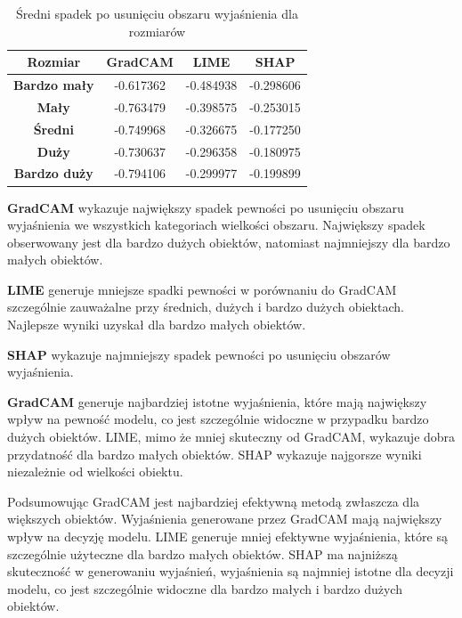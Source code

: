 \begin{table}[h]
	\centering
	\begin{tabular}{|c|c|c|c|}
		\hline
		\textbf{Rozmiar}     & \textbf{GradCAM} & \textbf{LIME} & \textbf{SHAP} \\
		\hline
		\textbf{Bardzo mały} & -0.617362        & -0.484938     & -0.298606     \\
		\hline
		\textbf{Mały}        & -0.763479        & -0.398575     & -0.253015     \\
		\hline
		\textbf{Średni}      & -0.749968        & -0.326675     & -0.177250     \\
		\hline
		\textbf{Duży}        & -0.730637        & -0.296358     & -0.180975     \\
		\hline
		\textbf{Bardzo duży} & -0.794106        & -0.299977     & -0.199899     \\
		\hline
	\end{tabular}
	\caption{Średni spadek po usunięciu obszaru wyjaśnienia dla rozmiarów}
	\label{tab:size_confidence_no_exp}
\end{table}

\textbf{GradCAM} wykazuje największy spadek pewności po usunięciu obszaru wyjaśnienia we wszystkich kategoriach wielkości obszaru.
Największy spadek obserwowany jest dla bardzo dużych obiektów, natomiast najmniejszy dla bardzo małych obiektów.

\textbf{LIME} generuje mniejsze spadki pewności w porównaniu do GradCAM szczególnie zauważalne przy średnich, dużych i bardzo dużych obiektach.
Najlepsze wyniki uzyskał dla bardzo małych obiektów.

\textbf{SHAP} wykazuje najmniejszy spadek pewności po usunięciu obszarów wyjaśnienia.

\textbf{GradCAM} generuje najbardziej istotne wyjaśnienia, które mają największy wpływ na pewność modelu, co jest szczególnie widoczne w przypadku bardzo dużych obiektów.
LIME, mimo że mniej skuteczny od GradCAM, wykazuje dobra przydatność dla bardzo małych obiektów.
SHAP wykazuje najgorsze wyniki niezależnie od wielkości obiektu.

\vspace{1cm}
Podsumowując GradCAM jest najbardziej efektywną metodą zwłaszcza dla większych obiektów.
Wyjaśnienia generowane przez GradCAM mają największy wpływ na decyzję modelu.
LIME generuje mniej efektywne wyjaśnienia, które są szczególnie użyteczne dla bardzo małych obiektów.
SHAP ma najniższą skuteczność w generowaniu wyjaśnień, wyjaśnienia są najmniej istotne dla decyzji modelu, co jest szczególnie widoczne dla bardzo małych i bardzo dużych obiektów.
